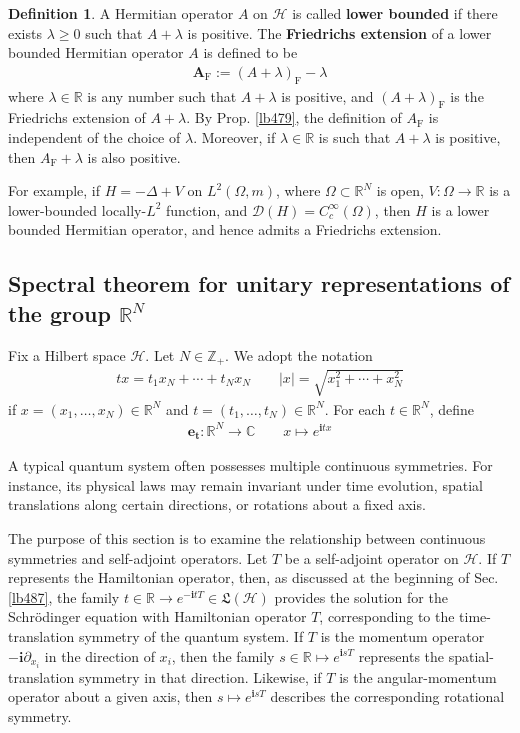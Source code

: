 \documentclass[12pt,b5paper,notitlepage]{article}
\theoremstyle{definition}
\newtheorem{df}{Definition}[subsection]
\theoremstyle{plain}
\newcommand{\fk}{\mathfrak}
\newcommand{\Dom}{\mathscr{D}}
\newcommand{\im}{\mathbf{i}}
\newcommand{\Cbb}{\mathbb C}
\newcommand{\Zbb}{\mathbb Z}
\newcommand{\Rbb}{\mathbb R}
\newcommand{\MH}{\mathcal H}
\newcommand{\Frm}{{\mathrm F}}
\numberwithin{equation}{section}
\begin{document}
\begin{df}
A Hermitian operator $A$ on $\MH$ is called \textbf{lower bounded}  if there exists $\lambda\geq0$ such that $A+\lambda$ is positive. The \textbf{Friedrichs extension}  of a lower bounded Hermitian operator $A$ is defined to be
\begin{align*}
\pmb{A_\Frm}:=(A+\lambda)_\Frm-\lambda
\end{align*}
where $\lambda\in\Rbb$ is any number such that $A+\lambda$ is positive, and $(A+\lambda)_\Frm$ is the Friedrichs extension of $A+\lambda$. By Prop. \ref{lb479}, the definition of $A_\Frm$ is independent of the choice of $\lambda$. Moreover, if $\lambda\in\Rbb$ is such that $A+\lambda$ is positive, then $A_\Frm+\lambda$ is also positive.
\end{df}


For example, if $H=-\Delta+V$ on $L^2(\Omega,m)$, where $\Omega\subset\Rbb^N$ is open, $V:\Omega\rightarrow\Rbb$ is a lower-bounded locally-$L^2$ function, and $\Dom(H)=C_c^\infty(\Omega)$, then $H$ is a lower bounded Hermitian operator, and hence admits a Friedrichs extension.


\subsection{Spectral theorem for unitary representations of the group $\Rbb^N$}\label{lb508}

Fix a Hilbert space $\MH$. Let $N\in\Zbb_+$. We adopt the notation
\begin{gather*}
tx=t_1x_N+\cdots+t_Nx_N\qquad |x|=\sqrt{x_1^2+\cdots+x_N^2}
\end{gather*}
if $x=(x_1,\dots,x_N)\in\Rbb^N$ and $t=(t_1,\dots,t_N)\in\Rbb^N$. For each $t\in\Rbb^N$, define 
\begin{align}\label{eq247}
\pmb{e_t}:\Rbb^N\rightarrow\Cbb\qquad x\mapsto e^{\im tx}
\end{align}


A typical quantum system often possesses multiple continuous symmetries. For instance, its physical laws may remain invariant under time evolution, spatial translations along certain directions, or rotations about a fixed axis.

The purpose of this section is to examine the relationship between continuous symmetries and self-adjoint operators. Let $T$ be a self-adjoint operator on $\MH$. If $T$ represents the Hamiltonian operator, then, as discussed at the beginning of Sec. \ref{lb487}, the family $t\in\Rbb\rightarrow e^{-\im tT}\in\fk L(\MH)$ provides the solution for the Schr\"odinger equation with Hamiltonian operator $T$, corresponding to the time-translation symmetry of the quantum system. If $T$ is the momentum operator $-\im\partial_{x_i}$ in the direction of $x_i$, then the family $s\in\Rbb\mapsto e^{\im s T}$ represents the spatial-translation symmetry in that direction. Likewise, if $T$ is the angular-momentum operator about a given axis, then $s\mapsto e^{\im sT}$ describes the corresponding rotational symmetry.
\end{document}
